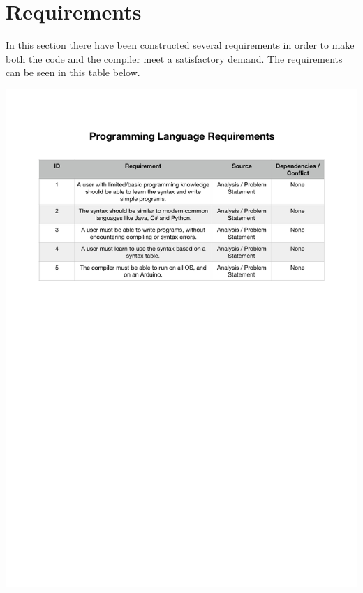\section{Requirements}
In this section there have been constructed several requirements in order to make both the code and the compiler meet a satisfactory demand. The requirements can be seen in this table below.

\includegraphics[scale=0.75]{sections/analysis/pdf/req.pdf}